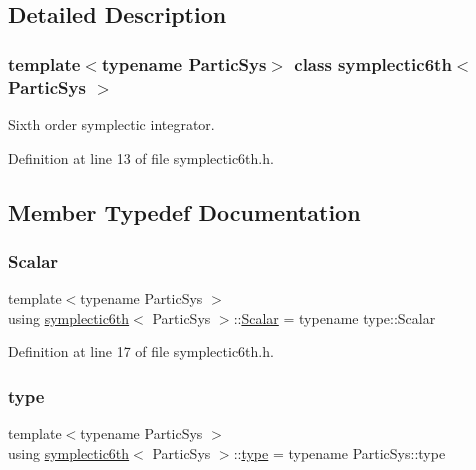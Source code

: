 \subsection{Detailed Description}
\subsubsection*{template$<$typename Partic\+Sys$>$\newline
class symplectic6th$<$ Partic\+Sys $>$}

Sixth order symplectic integrator. 

Definition at line 13 of file symplectic6th.\+h.



\subsection{Member Typedef Documentation}
\mbox{\label{classsymplectic6th_a1059d63d55058db7c6ab5b71e097f3ee}} 
\subsubsection{\texorpdfstring{Scalar}{Scalar}}
{\footnotesize\ttfamily template$<$typename Partic\+Sys $>$ \\
using \mbox{\hyperlink{classsymplectic6th}{symplectic6th}}$<$ Partic\+Sys $>$\+::\mbox{\hyperlink{classsymplectic6th_a1059d63d55058db7c6ab5b71e097f3ee}{Scalar}} =  typename type\+::\+Scalar}



Definition at line 17 of file symplectic6th.\+h.

\mbox{\label{classsymplectic6th_a8c8736cf1193abff40c406149a32ee78}} 
\subsubsection{\texorpdfstring{type}{type}}
{\footnotesize\ttfamily template$<$typename Partic\+Sys $>$ \\
using \mbox{\hyperlink{classsymplectic6th}{symplectic6th}}$<$ Partic\+Sys $>$\+::\mbox{\hyperlink{classsymplectic6th_a8c8736cf1193abff40c406149a32ee78}{type}} =  typename Partic\+Sys\+::type}



